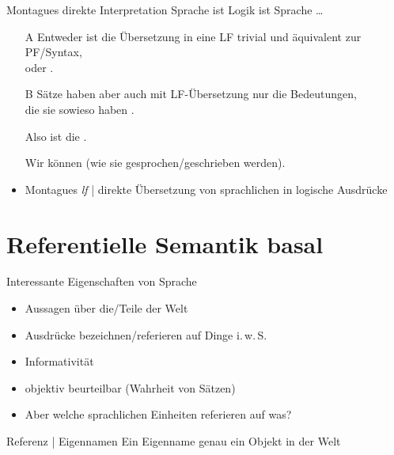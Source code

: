 \begin{frame}
  {Montagues direkte Interpretation}
  \onslide<+->
  \onslide<+->
  Sprache ist Logik ist Sprache \ldots\\
  \Halbzeile
  \begin{itemize}[<+->]
    \item[A] Entweder ist die \alert{Übersetzung in eine LF trivial und äquivalent zur PF\slash Syntax},\\
      oder .
    \item[B] Sätze haben aber auch \alert{mit LF-Übersetzung nur die Bedeutungen,\\
      die sie sowieso haben} .
    \item[\ding{222}] Also ist die .
    \item[\ding{222}] Wir können  (wie sie gesprochen\slash geschrieben werden).
     \Zeile 
   \item \alert{Montagues \textit{lf}} | direkte Übersetzung von sprachlichen in logische Ausdrücke
  \end{itemize}
\end{frame}

\section{Referentielle Semantik basal}

\begin{frame}
  {Interessante Eigenschaften von Sprache}
  \onslide<+->
  \begin{itemize}[<+->]
    \item Aussagen über die\slash Teile der Welt
    \item Ausdrücke bezeichnen\slash referieren auf Dinge i.\,w.\,S.
    \item Informativität
    \item objektiv beurteilbar (\zB Wahrheit von Sätzen)
      \Zeile
    \item \alert{Aber welche sprachlichen Einheiten referieren auf was?}
  \end{itemize}
\end{frame}

\begin{frame}
  {Referenz | Eigennamen}
  \onslide<+->
  \onslide<+->
  Ein \alert{Eigenname}  \alert{genau ein Objekt} in der Welt\\
  \onslide<+->
  \Zeile
  \centering
\end{frame}

